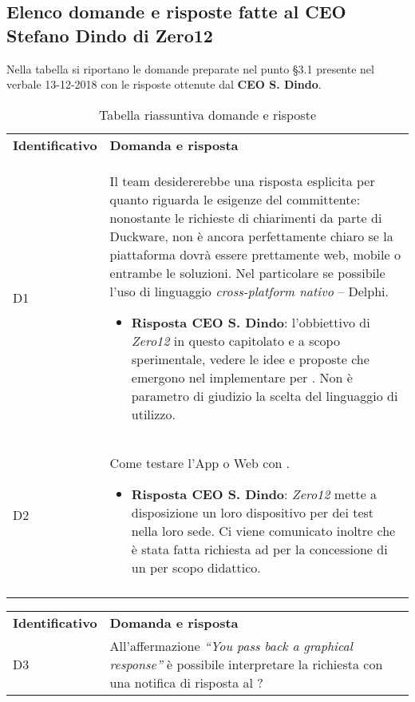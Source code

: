 	\subsection{Elenco domande e risposte fatte al CEO Stefano Dindo di Zero12}
	\label{sec:elenco_domande}
	Nella tabella si riportano le domande preparate nel punto §3.1 presente nel verbale 13-12-2018 con le risposte ottenute dal \textbf{CEO S. Dindo}.
		\begin{center}
			\renewcommand{\arraystretch}{1.5}
			\begin{longtable}{  p{2.5cm} p{11.7cm} }
				\rowcolor{tableHeadYellow}
				\textbf{Identificativo}&\textbf{Domanda e risposta}\\
				D1 & Il team desidererebbe una risposta esplicita per quanto riguarda le esigenze del committente: nonostante le richieste di chiarimenti  da parte di Duckware, non è ancora perfettamente chiaro se la piattaforma dovrà  essere prettamente web, mobile o entrambe le soluzioni. Nel particolare se possibile l'uso di linguaggio \emph{cross-platform nativo} – Delphi.
				\begin{itemize}
					\item \textbf{Risposta CEO S. Dindo}: l'obbiettivo di \emph{Zero12} in questo capitolato e a scopo sperimentale, vedere le idee e proposte che emergono nel implementare \emph{\markg{workflow}} per \emph{\markg{Alexa}}. Non è parametro di giudizio la scelta del linguaggio di utilizzo.
				\end{itemize}
				\\
				D2 & Come testare l’App o Web con \markg{Alexa}.
				\begin{itemize}
					\item \textbf{Risposta CEO S. Dindo}: \emph{Zero12} mette a disposizione un loro dispositivo per dei test nella loro sede. Ci viene comunicato inoltre che è stata fatta richiesta ad \markg{Amazon} per la concessione di un \emph{\markg{Amazon} \markg{Alexa}} per scopo didattico.
				\end{itemize}
				\\
				\rowcolor{white}
				\caption{Tabella riassuntiva domande e risposte}
			\end{longtable}	
			\clearpage
			\renewcommand{\arraystretch}{1.5}
			\begin{longtable}{  p{2.5cm} p{11.7cm} }
				\rowcolor{tableHeadYellow}
					\textbf{Identificativo}&\textbf{Domanda e risposta}\\
				D3 &  All'affermazione \emph{“You pass back a graphical response”} è possibile interpretare la richiesta con una notifica di risposta al \markg{workflow}?

\end{longtable}
\end{center}
